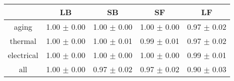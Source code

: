 \begin{tabular}{c c c c c }
\hline
 & LB & SB & SF & LF \\
\hline
aging & 1.00 $\pm$ 0.00 & 1.00 $\pm$ 0.00 & 1.00 $\pm$ 0.00 & 0.97 $\pm$ 0.02 \\
thermal & 1.00 $\pm$ 0.00 & 1.00 $\pm$ 0.01 & 0.99 $\pm$ 0.01 & 0.97 $\pm$ 0.02 \\
electrical & 1.00 $\pm$ 0.00 & 1.00 $\pm$ 0.00 & 1.00 $\pm$ 0.00 & 0.99 $\pm$ 0.01 \\
all & 1.00 $\pm$ 0.00 & 0.97 $\pm$ 0.02 & 0.97 $\pm$ 0.02 & 0.90 $\pm$ 0.03 \\
\hline
\end{tabular}